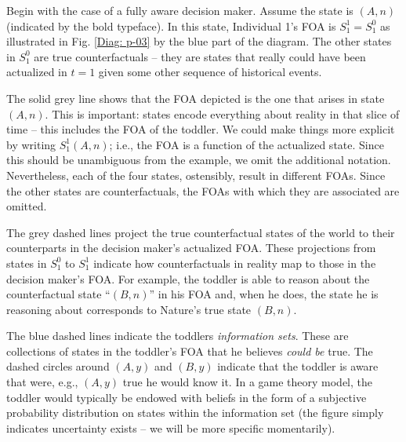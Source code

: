 \documentclass[
11pt,
titlepage,
reqno,
]{article}%
\theoremstyle{definition}
\begin{document}
Begin with the case of a fully aware decision maker. Assume the state is $(A,n)$ (indicated by the bold typeface). In this state, Individual 1's FOA is $S_1^1=S^0_1$ as illustrated in Fig. \ref{Diag: p-03} by the blue part of the diagram. The other states in $S^0_1$ are true counterfactuals -- they are states that really could have been actualized in $t=1$ given some other sequence of historical events. 

The solid grey line shows that the FOA depicted is the one that arises in state $(A,n)$. This is important: states encode everything about reality in that slice of time -- this includes the FOA of the toddler. We could make things more explicit by writing $S^1_1(A,n)$; i.e., the FOA is a function of the actualized state. Since this should be unambiguous from the example, we omit the additional notation. Nevertheless, each of the four states, ostensibly, result in different FOAs. Since the other states are counterfactuals, the FOAs with which they are associated are omitted. 

The grey dashed lines project the true counterfactual states of the world to their counterparts in the decision maker's actualized FOA. These projections from states in $S^0_1$ to $S^1_1$ indicate how counterfactuals in reality map to those in the decision maker's FOA. For example, the toddler is able to reason about the counterfactual state ``$(B,n)$'' in his FOA and, when he does, the state he is reasoning about corresponds to Nature's true state $(B,n)$.

 The blue dashed lines indicate the toddlers \textit{information sets}. These are collections of states in the toddler's FOA that he believes \textit{could be} true. The dashed circles around $(A,y)$ and $(B,y)$ indicate that the toddler is aware that were, e.g., $(A,y)$ true he would know it. In a game theory model, the toddler would typically be endowed with beliefs in the form of a subjective probability distribution on states within the information set (the figure simply indicates uncertainty exists -- we will be more specific momentarily).
\end{document}

